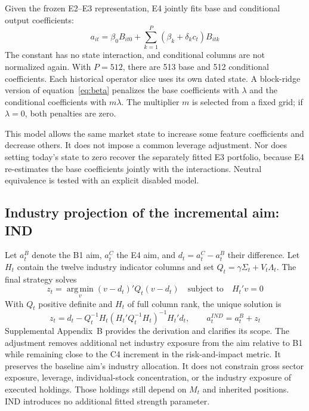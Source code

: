 \documentclass[12pt,letterpaper,fleqn]{article}
\newcommand{\argmin}{\operatorname*{arg\,min}}
\begin{document}
Given the frozen E2--E3 representation, E4 jointly fits base and conditional output coefficients:
\begin{equation}\label{eq:conditional}
 a_{it}=\beta_0B_{it0}
        +\sum_{k=1}^{P}(\beta_k+\delta_kc_t)B_{itk}
\end{equation}
The constant has no state interaction, and conditional columns are not normalized again. With $P=512$, there are 513 base and 512 conditional coefficients. Each historical operator slice uses its own dated state. A block-ridge version of equation~\eqref{eq:beta} penalizes the base coefficients with $\lambda$ and the conditional coefficients with $m\lambda$. The multiplier $m$ is selected from a fixed grid; if $\lambda=0$, both penalties are zero.

This model allows the same market state to increase some feature coefficients and decrease others. It does not impose a common leverage adjustment. Nor does setting today's state to zero recover the separately fitted E3 portfolio, because E4 re-estimates the base coefficients jointly with the interactions. Neutral equivalence is tested with an explicit disabled model.

\subsection{Industry projection of the incremental aim: IND}\label{sec:ind}
Let $a_t^B$ denote the B1 aim, $a_t^C$ the E4 aim, and $d_t=a_t^C-a_t^B$ their difference. Let $H_t$ contain the twelve industry indicator columns and set $Q_t=\gamma\Sigma_t+V_t\Lambda_t$. The final strategy solves
\begin{equation}\label{eq:projectproblem}
 z_t=\argmin_v(v-d_t)'Q_t(v-d_t)
             \quad\text{subject to}\quad H_t'v=0
\end{equation}
With $Q_t$ positive definite and $H_t$ of full column rank, the unique solution is
\begin{equation}\label{eq:projection}
 z_t=d_t-Q_t^{-1}H_t(H_t'Q_t^{-1}H_t)^{-1}H_t'd_t,
 \qquad a_t^{IND}=a_t^B+z_t
\end{equation}
Supplemental Appendix~B provides the derivation and clarifies its scope. The adjustment removes additional net industry exposure from the aim relative to B1 while remaining close to the C4 increment in the risk-and-impact metric. It preserves the baseline aim's industry allocation. It does not constrain gross sector exposure, leverage, individual-stock concentration, or the industry exposure of executed holdings. Those holdings still depend on $M_t$ and inherited positions. IND introduces no additional fitted strength parameter.
\end{document}
